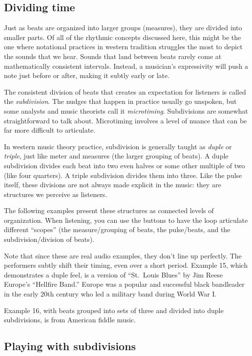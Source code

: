 \documentclass[twoside]{article}
\begin{document}
\hypertarget{dividing-time}{%
\subsection*{Dividing time}\label{dividing-time}}

Just as beats are organized into larger groups (measures), they are
divided into smaller parts. Of all of the rhythmic concepts discussed
here, this might be the one where notational practices in western
tradition struggles the most to depict the sounds that we hear. Sounds
that land between beats rarely come at mathematically consistent
intervals. Instead, a musician's expressivity will push a note just
before or after, making it subtly early or late.

The consistent division of beats that creates an expectation for
listeners is called the \emph{subdivision}. The nudges that happen in
practice usually go unspoken, but some analysts and music theorists call
it \emph{microtiming}. Subdivisions are somewhat straightforward to talk
about. Microtiming involves a level of nuance that can be far more
difficult to articulate.

In western music theory practice, subdivision is generally taught as
\emph{duple} or \emph{triple}, just like meter and measures (the larger
grouping of beats). A duple subdivision divides each beat into two even
halves or some other multiple of two (like four quarters). A triple
subdivision divides them into three. Like the pulse itself, these
divisions are not always made explicit in the music: they are structures
we perceive as listeners.

The following examples present these structures as connected levels of
organization. When listening, you can use the buttons to have the loop
articulate different ``scopes'' (the measure/grouping of beats, the
pulse/beats, and the subdivision/division of beats).

Note that since these are real audio examples, they don't line up
perfectly. The performers subtly shift their timing, even over a short
period. Example 15, which demonstrates a duple feel, is a version
of ``St.~Louis Blues'' by Jim Reese Europe's ``Hellfire Band.'' Europe
was a popular and successful black bandleader in the early 20th century
who led a military band during World War I.

Example 16, with beats grouped into sets of three and divided
into duple subdivisions, is from American fiddle music.

\hypertarget{playing-with-subdivisions}{%
\subsection*{Playing with
subdivisions}\label{playing-with-subdivisions}}
\end{document}

